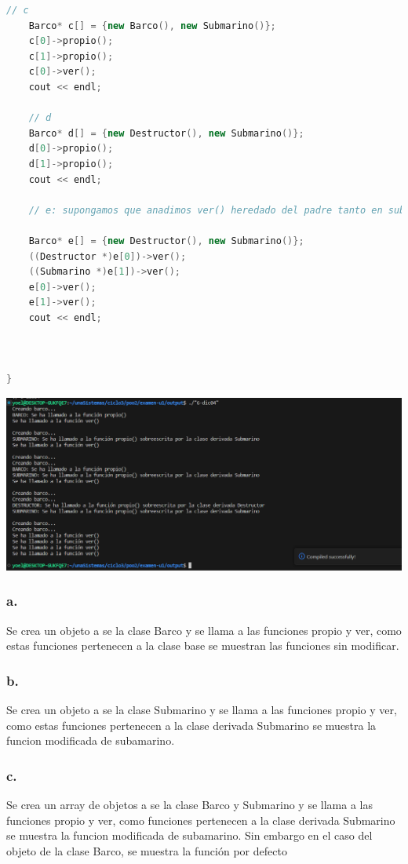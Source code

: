 \documentclass[11pt,a4paper]{article}
\begin{document}
\begin{lstlisting}[language=C++, style=mystyle, caption={6-DIC04}]
    // c
    Barco* c[] = {new Barco(), new Submarino()};
    c[0]->propio();
    c[1]->propio();
    c[0]->ver();
    cout << endl;

    // d
    Barco* d[] = {new Destructor(), new Submarino()};
    d[0]->propio();
    d[1]->propio();
    cout << endl;

    // e: supongamos que anadimos ver() heredado del padre tanto en submarino como en destructor;

    Barco* e[] = {new Destructor(), new Submarino()};
    ((Destructor *)e[0])->ver();
    ((Submarino *)e[1])->ver();
    e[0]->ver();
    e[1]->ver();
    cout << endl;



}
\end{lstlisting}

{\includegraphics[width=1\textwidth]{images/1-compilado.png}\par}

\subsubsection{a. }
Se crea un objeto a se la clase Barco y se llama a las funciones propio y ver, como estas funciones pertenecen a la clase base se muestran las funciones sin modificar.
\subsubsection{b. }
Se crea un objeto a se la clase Submarino y se llama a las funciones propio y ver, como estas funciones pertenecen a la clase derivada Submarino se muestra la funcion modificada de subamarino.
\subsubsection{c. }
Se crea un array de objetos a se la clase Barco y Submarino y se llama a las funciones propio y ver, como funciones pertenecen a la clase derivada Submarino se muestra la funcion modificada de subamarino. Sin embargo en el caso del objeto de la clase Barco, se muestra la función por defecto
\end{document}
